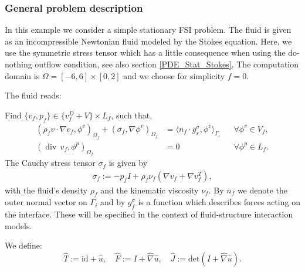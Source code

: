 \subsubsection{General problem description}

In this example we consider a simple stationary FSI problem.   The fluid
is given as an incompressible Newtonian fluid modeled by the Stokes equation. Here, we use the symmetric stress tensor which has a little consequence when using the do-nothing outflow condition, see also section \ref{PDE_Stat_Stokes}.   
The computation domain is $\Omega = [-6,6]\times [0,2]$ and we choose for simplicity $f=0$. 

The fluid reads: 
\begin{Problem}
 Find $\{v_f,p_f\} \in \{ v_f^D + V\} \times L_f$, such that,
  \begin{equation*}
    \begin{aligned} 
      (\rho_f v\cdot\nabla v_f,\phi^v)_{\Omega_f} +
      (\sigma_f,\nabla\phi^v)_{\Omega_f} 
      &= \langle n_f\cdot g_s^\sigma ,\phi^v \rangle_{\Gamma_i}
      &&\forall \phi^v\in V_f, \\
      (\operatorname{div}\, v_f,\phi^p)_{\Omega_f} &= 0
      &&\forall\phi^p\in L_f.
    \end{aligned}
  \end{equation*}
  The Cauchy stress tensor $\sigma_f$ is given by 
  \begin{eqnarray}
    \sigma_f:=-p_f I + \rho_f\nu_f (\nabla v_f+\nabla v_f^T),
  \end{eqnarray}
  with the fluid's density $\rho_f$  and the kinematic viscosity
  $\nu_f$. By $n_f$ we denote the outer normal vector on $\Gamma_i$
  and by $g^\sigma_f$ is a function which describes forces acting on the interface. These
  will be specified in the context of fluid-structure interaction
  models.  
\end{Problem}
We define:
\begin{equation*}
\hat T:=\text{id}+\hat u,\quad
\hat F:=I+\hat\nabla \hat u,\quad
\hat J:=\text{det}(I+\hat\nabla \hat u).
\end{equation*}


